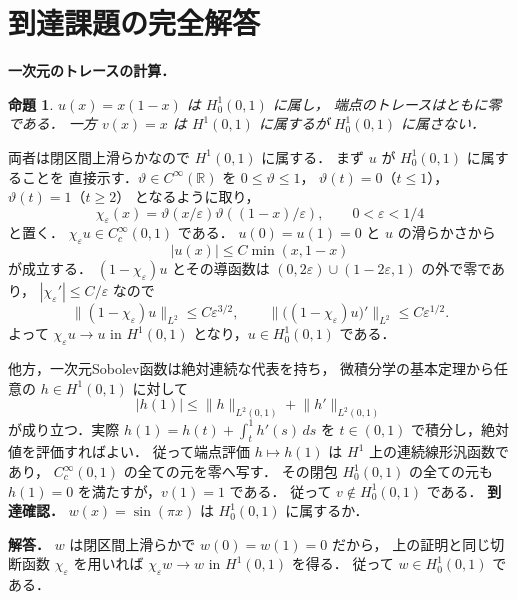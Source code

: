 \documentclass[a5paper,10pt,onecolumn]{jsarticle}
\makeatletter
\theoremstyle{mathnotetheorem}
\newtheorem{proposition}[theorem]{命題}
\renewcommand{\proofname}{証明}
\renewenvironment{proof}[1][\proofname]{%
  \par\pushQED{\qed}\normalfont\topsep4\p@\@plus2\p@\relax
  \trivlist\item[\hskip\labelsep\bfseries #1]\ignorespaces
}{\popQED\endtrivlist\@endpefalse}
\newcommand{\norm}[1]{\lVert #1\rVert}
\makeatother
\begin{document}
\section{到達課題の完全解答}
\noindent\textbf{一次元のトレースの計算．}
\begin{proposition}
$u(x)=x(1-x)$ は $H_0^1(0,1)$ に属し，
端点のトレースはともに零である．
一方 $v(x)=x$ は $H^1(0,1)$ に属するが
$H_0^1(0,1)$ に属さない．
\end{proposition}
\begin{proof}
両者は閉区間上滑らかなので $H^1(0,1)$ に属する．
まず $u$ が $H_0^1(0,1)$ に属することを
直接示す．$\vartheta\in C^\infty(\mathbb R)$ を
$0\le\vartheta\le1$，
$\vartheta(t)=0$（$t\le1$），
$\vartheta(t)=1$（$t\ge2$）
となるように取り，
\[
 \chi_\varepsilon(x)
 =\vartheta(x/\varepsilon)
  \vartheta((1-x)/\varepsilon),
 \qquad0<\varepsilon<1/4
\]
と置く．
$\chi_\varepsilon u\in C_c^\infty(0,1)$ である．
$u(0)=u(1)=0$ と $u$ の滑らかさから
\[
 |u(x)|\le C\min(x,1-x)
\]
が成立する．
$(1-\chi_\varepsilon)u$ とその導函数は
$(0,2\varepsilon)\cup(1-2\varepsilon,1)$
の外で零であり，
$|\chi_\varepsilon'|\le C/\varepsilon$ なので
\[
 \norm{(1-\chi_\varepsilon)u}_{L^2}
 \le C\varepsilon^{3/2},\qquad
 \norm{\bigl((1-\chi_\varepsilon)u\bigr)'}_{L^2}
 \le C\varepsilon^{1/2}.
\]
よって $\chi_\varepsilon u\to u$ in $H^1(0,1)$
となり，$u\in H_0^1(0,1)$ である．

他方，一次元Sobolev函数は絶対連続な代表を持ち，
微積分学の基本定理から任意の
$h\in H^1(0,1)$ に対して
\[
 |h(1)|\le\norm h_{L^2(0,1)}
                 +\norm{h'}_{L^2(0,1)}
\]
が成り立つ．実際
$h(1)=h(t)+\int_t^1h'(s)\,ds$ を
$t\in(0,1)$ で積分し，絶対値を評価すればよい．
従って端点評価 $h\mapsto h(1)$ は
$H^1$ 上の連続線形汎函数であり，
$C_c^\infty(0,1)$ の全ての元を零へ写す．
その閉包 $H_0^1(0,1)$ の全ての元も
$h(1)=0$ を満たすが，$v(1)=1$ である．
従って $v\notin H_0^1(0,1)$ である．
\end{proof}
\noindent\textbf{到達確認．}
$w(x)=\sin(\pi x)$ は $H_0^1(0,1)$ に属するか．
\par\noindent\textbf{解答．}
$w$ は閉区間上滑らかで $w(0)=w(1)=0$ だから，
上の証明と同じ切断函数 $\chi_\varepsilon$ を用いれば
$\chi_\varepsilon w\to w$ in $H^1(0,1)$ を得る．
従って $w\in H_0^1(0,1)$ である．
\end{document}

